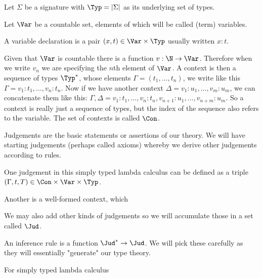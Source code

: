 Let $\Sigma$ be a signature with $\Typ=|\Sigma|$ as its underlying set of types.

Let $\Var$ be a countable set, elements of which will be called (term) variables.

A variable declaration is a pair $(x, t) \in \Var \times \Typ$ usually written $x:t$.

Given that $\Var$ is countable there is a function $v : \N \to \Var$. Therefore when we write $v_n$ we are specifying the $n$th element of $\Var$. A context is then a sequence of types $\Typ^*$, whose elements $\Gamma = (t_1,\dots, t_n)$, we write like this $\Gamma = v_1:t_1, \dots, v_n:t_n$. Now if we have another context $\Delta =v_1:u_1, \dots, v_m:u_m$, we can concatenate them like this: $\Gamma,\Delta = v_1:t_1,\dots, v_n:t_n, v_{n+1}:u_1,\dots,v_{n+m}: u_m$. So a context is really just a sequence of types, but the index of the sequence also refers to the variable. The set of contexts is called $\Con$.

Judgements are the basic statements or assertions of our theory. We will have starting judgements (perhaps called axioms) whereby we derive other judgements according to rules.

One judgement in this simply typed lambda calculus can be defined as a triple $(\Gamma, t, T) \in \Con \times \Var \times \Typ$. 

Another is a well-formed context, which 

We may also add other kinds of judgements so we will accumulate those in a set called $\Jud$.

An inference rule is a function $\Jud^* \to \Jud$. We will pick these carefully as they will essentially "generate" our type theory.

For simply typed lambda calculus

